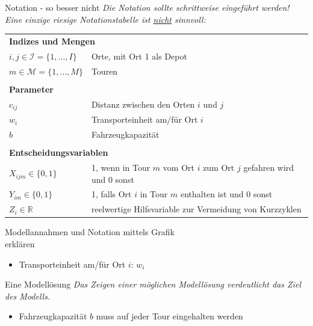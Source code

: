\begin{frame}{Notation - so besser nicht}
    \textit{Die Notation sollte schrittweise eingeführt werden! Eine einzige riesige Notationstabelle ist \underline{nicht} sinnvoll:}
    \begin{tabular}{ll}
        \toprule 
		\multicolumn{2}{l}{\textbf{Indizes und Mengen}} \\
		$i, j \in \mathcal{I} = \{1, \dots, I\}$ & Orte, mit Ort 1 als Depot\\
		$m \in \mathcal{M} = \{1, \dots, M\}$ & Touren\\
		&\\
		\multicolumn{2}{l}{\textbf{Parameter}} \\
		$c_{ij}$& Distanz zwischen den Orten $i$ und $j$\\
		$w_i$ & Transporteinheit am/für Ort $i$ \\
		$b$ & Fahrzeugkapazität\\
		&\\
		\multicolumn{2}{l}{\textbf{Entscheidungsvariablen}} \\
		$X_{ijm} \in \{0,1\}$ & 1, wenn in Tour $m$ vom Ort $i$ zum Ort $j$ gefahren wird und 0 sonst \\	
		$Y_{im} \in \{0,1\}$ & 1, falls Ort $i$ in Tour $m$ enthalten ist und 0 sonst\\
		$Z_{i} \in \mathbb{R}$ & reelwertige Hilfsvariable zur Vermeidung von Kurzzyklen\\
		\bottomrule   		
		\end{tabular}
\end{frame}

\begin{frame}{Modellannahmen und Notation mittels Grafik \\erklären}
    \centering
    
    \begin{itemize}
        \item  Transporteinheit am/für Ort $i$: $w_i$ \\
    \end{itemize}
\end{frame}

\begin{frame}{Eine Modellösung}
    \textit{Das Zeigen einer möglichen Modellösung verdeutlicht das Ziel des Modells.}
    \begin{center}
        
    \end{center}
    \begin{itemize}
        \item Fahrzeugkapazität $b$ muss auf jeder Tour eingehalten werden
    \end{itemize}
\end{frame}

